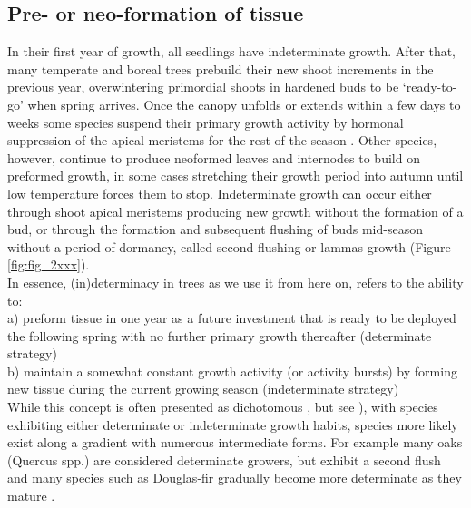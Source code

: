 \documentclass{article}
\begin{document}
	\subsection*{Pre- or neo-formation of tissue}
	In their first year of growth, all seedlings have indeterminate growth. After that, many temperate and boreal trees prebuild their new shoot increments in the previous year, overwintering primordial shoots in hardened buds to be `ready-to-go' when spring arrives. Once the canopy unfolds or extends within a few days to weeks some species suspend their primary growth activity by hormonal suppression of the apical meristems for the rest of the season \citep[paradormancy,][]{langEndoParaEcodormancy1987}.  Other species, however, continue to produce neoformed leaves and internodes to build on preformed growth, in some cases stretching their growth period into autumn until low temperature forces them to stop. Indeterminate growth can occur either through shoot apical meristems producing new growth without the formation of a bud, or through the formation and subsequent flushing of buds mid-season without a period of dormancy, called second flushing or lammas growth (Figure \ref{fig:fig_2xxx}). \\
	In essence, (in)determinacy in trees as we use it from here on, refers to the ability to:\\
	a) preform tissue in one year as a future investment that is ready to be deployed the following spring with no further primary growth thereafter (determinate strategy)\\
	b) maintain a somewhat constant growth activity (or activity bursts) by forming new tissue during the current growing season (indeterminate strategy)\\

While this concept is often presented as dichotomous \citep{kozlowskiGrowthControlWoody1997, lechowiczWhyTemperateDeciduous1984a}, but see \citealp{kikuzawaLeafSurvivalWoody1983, damascosBudCompositionBranching2005}), with species exhibiting either determinate or indeterminate growth habits, species more likely exist along a gradient with numerous intermediate forms. For example many oaks (Quercus spp.) are considered determinate growers, but exhibit a second flush and many species such as Douglas-fir gradually become more determinate as they mature \citep{borchertConceptJuvenilityWoody1976, heuretOntogeneticTrendsMorphological2006}.
\end{document}
